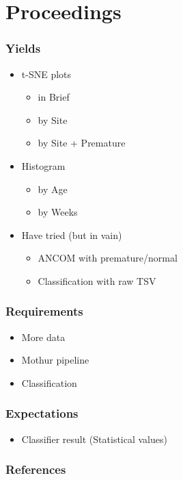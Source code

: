\documentclass{beamer}
\begin{document}
    \section{Proceedings}
    \begin{frame}[allowframebreaks]
        \frametitle{Yields}

        \begin{itemize}
            \item t-SNE plots
            \begin{itemize}
                \item in Brief
                \item by Site
                \item by Site + Premature
            \end{itemize}

            \item Histogram
            \begin{itemize}
                \item by Age
                \item by Weeks
            \end{itemize}

            \item Have tried (but in vain)
            \begin{itemize}
                \item ANCOM with premature/normal
                \item Classification with raw TSV
            \end{itemize}
        \end{itemize}
    \end{frame}

    \begin{frame}[allowframebreaks]
        \frametitle{Requirements}

        \begin{itemize}
            \item More data
            \item Mothur pipeline
            \item Classification
        \end{itemize}
    \end{frame}

    \begin{frame}[allowframebreaks]
        \frametitle{Expectations}

        \begin{itemize}
            \item Classifier result (Statistical values)
        \end{itemize}
    \end{frame}

   	\begin{frame}[allowframebreaks]
        \frametitle{References}
        
        
    \end{frame}
\end{document}

